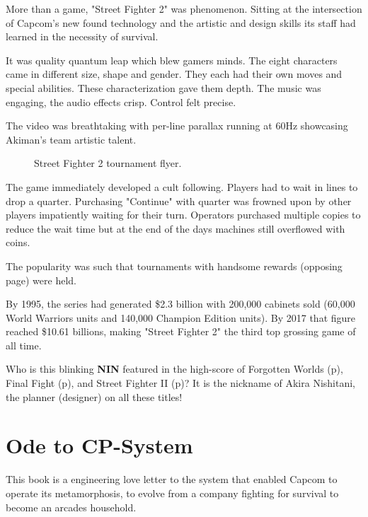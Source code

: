 More than a game, "Street Fighter 2" was phenomenon. Sitting at the intersection of Capcom's new found technology and the artistic and design skills its staff had learned in the necessity of survival.

It was quality quantum leap which blew gamers minds. The eight characters came in different size, shape and gender. They each had their own moves and special abilities. These characterization gave them depth. The music was engaging, the audio effects crisp. Control felt precise. 

The video was breathtaking with per-line parallax running at 60Hz showcasing Akiman's team artistic talent. 


\begin{figure}[H]
\caption*{Street Fighter 2 tournament flyer.}
\end{figure}

The game immediately developed a cult following. Players had to wait in lines to drop a quarter. Purchasing "Continue" with quarter was frowned upon by other players impatiently waiting for their turn. Operators purchased multiple copies to reduce the wait time but at the end of the days machines still overflowed with coins\cite{sf2_oral_history}.

The popularity was such that tournaments with handsome rewards (opposing page) were held. 

By 1995, the series had generated \$2.3 billion with 200,000 cabinets sold\cite{usgamer20160101} (60,000 World Warriors units and 140,000 Champion Edition units). By 2017 that figure reached \$10.61 billions\cite{gamerevolution20140126}, making "Street Fighter 2" the third top grossing game of all time.

\begin{trivia}
Who is this blinking \textbf{NIN} featured in the high-score of Forgotten Worlds (p\pageref{nin_fw}), Final Fight (p\pageref{nin_ff}), and Street Fighter II (p\pageref{nin_sf2})? It is the nickname of Akira Nishitani, the planner (designer) on all these titles!
\end{trivia}

\section{Ode to CP-System}

This book is a engineering love letter to the system that enabled Capcom to operate its metamorphosis, to evolve from a company fighting for survival to become an arcades household.

